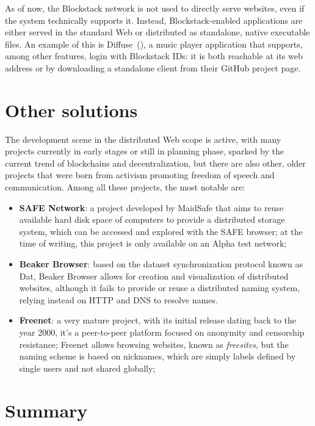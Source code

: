 \documentclass[mscthesis]{usiinfthesis}
\begin{document}
As of now, the Blockstack network is not used to directly serve websites, even if the system technically supports it. Instead, Blockstack-enabled applications are either served in the standard Web or distributed as standalone, native executable files. An example of this is Diffuse~(\cite{website:diffuse}), a music player application that supports, among other features, login with Blockstack IDs: it is both reachable at its web address or by downloading a standalone client from their GitHub project page.

\section{Other solutions}\label{sec:browserprojects}

The development scene in the distributed Web scope is active, with many projects currently in early stages or still in planning phase, sparked by the current trend of blockchains and decentralization, but there are also other, older projects that were born from activism promoting freedom of speech and communication. Among all these projects, the most notable are:

\begin{itemize}
	\item \textbf{SAFE Network}: a project developed by MaidSafe that aims to reuse available hard disk space of computers to provide a distributed storage system, which can be accessed and explored with the SAFE browser; at the time of writing, this project is only available on an Alpha test network;
	\item \textbf{Beaker Browser}: based on the dataset synchronization protocol known as Dat, Beaker Browser allows for creation and visualization of distributed websites, although it fails to provide or reuse a distributed naming system, relying instead on HTTP and DNS to resolve names.
	\item \textbf{Freenet}: a very mature project, with its initial release dating back to the year 2000, it's a peer-to-peer platform focused on anonymity and censorship resistance; Freenet allows browsing websites, known as \emph{freesites}, but the naming scheme is based on nicknames, which are simply labels defined by single users and not shared globally;
\end{itemize}

\section{Summary}
\end{document}
